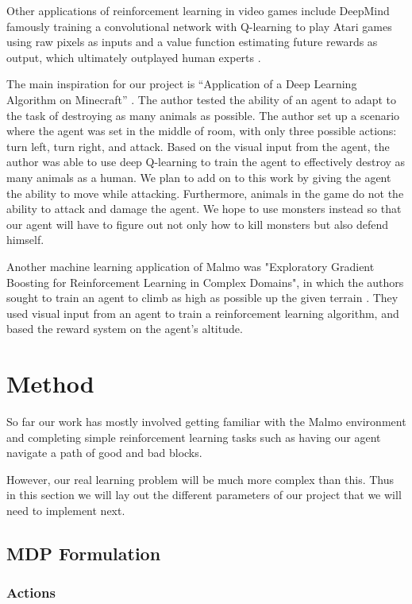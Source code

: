 \documentclass{article}
\begin{document}
Other applications of reinforcement learning in video games include DeepMind famously training a convolutional network with Q-learning to play Atari games using raw pixels as inputs and a value function estimating future rewards as output, which ultimately outplayed human experts \cite{deepMind}.

The main inspiration for our project is “Application of a Deep Learning Algorithm on Minecraft” \cite{vandegoor}. The author tested the ability of an agent to adapt to the task of destroying as many animals as possible. The author set up a scenario where the agent was set in the middle of room, with only three possible actions: turn left, turn right, and attack. Based on the visual input from the agent, the author was able to use deep Q-learning to train the agent to effectively destroy as many animals as a human. We plan to add on to this work by giving the agent the ability to move while attacking. Furthermore, animals in the game do not the ability to attack and damage the agent. We hope to use monsters instead so that our agent will have to figure out not only how to kill monsters but also defend himself.

Another machine learning application of Malmo was "Exploratory Gradient Boosting for Reinforcement Learning in Complex Domains", in which the authors sought to train an agent to climb as high as possible up the given terrain \cite{abelEtal}. They used visual input from an agent to train a reinforcement learning algorithm, and based the reward system on the agent's altitude. 

\section{Method}

So far our work has  mostly involved getting familiar with the Malmo environment and completing simple  reinforcement learning tasks such as  having our agent  navigate a path of good and bad blocks.

However, our real learning problem will be much more complex than this. Thus in this section we will lay out the different parameters of our project that we will need to implement next.

\subsection{ MDP Formulation}

\subsubsection{ Actions}
\end{document}

